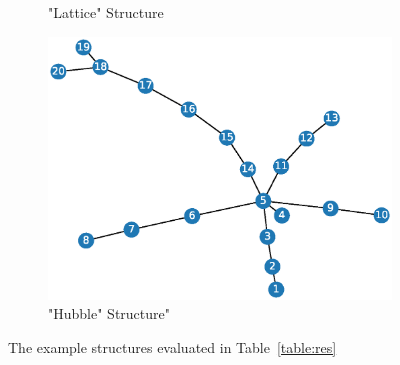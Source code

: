 \documentclass{article}
\begin{document}
\begin{figure}[h!]
\begin{subfigure}[b]{0.3\textwidth}
        \caption{"Lattice" Structure}
    \end{subfigure}
    \hfill
    \begin{subfigure}[b]{0.3\textwidth}
        \centering
        \includegraphics[width=\textwidth]{figs/Hubble.eps}
        \caption{"Hubble" Structure"}
    \end{subfigure}
    \caption{The example structures evaluated in Table~\ref{table:res}}
    \label{fig:structs}
\end{figure}
\end{document}
